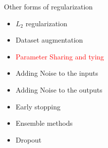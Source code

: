 \begin{frame}
\end{frame}

\begin{frame}
	\vspace{4em}
	\begin{overlayarea}{\textwidth}{\textheight}
		\begin{block}{Other forms of regularization}
			\begin{itemize}
				\item $L_2$ regularization
				\item Dataset augmentation
				\item \textcolor<2->{red}{Parameter Sharing and tying}
				\item Adding Noise to the inputs 
				\item Adding Noise to the outputs 
				\item Early stopping
				\item Ensemble methods
				\item Dropout
			\end{itemize}
		\end{block}
	\end{overlayarea}
\end{frame}
		
